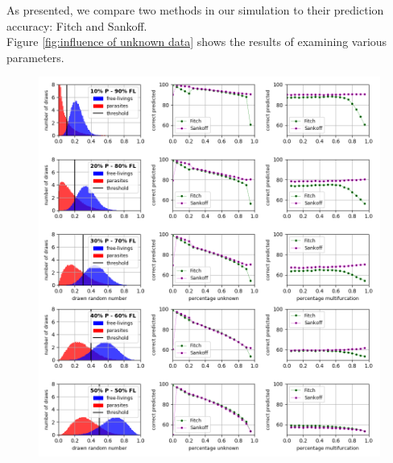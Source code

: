     As presented, we compare two methods in our simulation to their prediction accuracy: Fitch and 
      Sankoff. \\
    Figure \ref{fig:influence of unknown data} shows the results of examining various parameters.
    \begin{figure}[h!]
      \centering
      \includegraphics[trim = 0mm 100mm 0mm 0mm, clip, width=\textwidth]{Figures/simulation_evaluation_1.png}
    \end{figure}
    ~ \\ ~ \\ ~ \\
